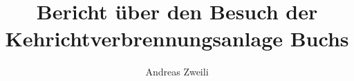 \documentclass{ibz}
\title{\textbf{Bericht über den Besuch der Kehrichtverbrennungsanlage Buchs}}
\author{Andreas Zweili}
\begin{document}

\tableofcontents

\newpage
\nocite{*}


\end{document}
